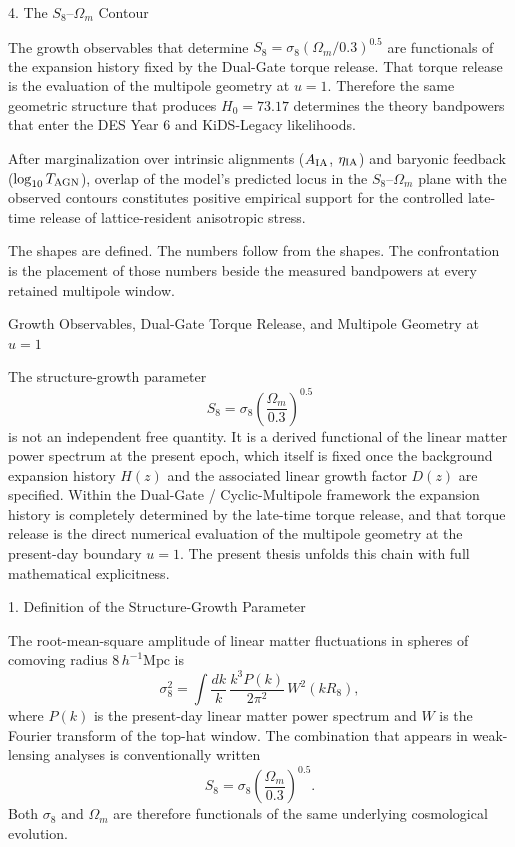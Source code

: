 4. The \(S_8\)–\(\Omega_m\) Contour

The growth observables that determine \(S_8=\sigma_8(\Omega_m/0.3)^{0.5}\) are functionals of the expansion history fixed by the Dual-Gate torque release. That torque release is the evaluation of the multipole geometry at \(u=1\). Therefore the same geometric structure that produces \(H_0=73.17\) determines the theory bandpowers that enter the DES Year 6 and KiDS-Legacy likelihoods.

After marginalization over intrinsic alignments (\(A_{\rm IA}\), \(\eta_{\rm IA}\)) and baryonic feedback (\(\log_{10}T_{\rm AGN}\)), overlap of the model’s predicted locus in the \(S_8\)–\(\Omega_m\) plane with the observed contours constitutes positive empirical support for the controlled late-time release of lattice-resident anisotropic stress.

The shapes are defined.  
The numbers follow from the shapes.  
The confrontation is the placement of those numbers beside the measured bandpowers at every retained multipole window.

Growth Observables, Dual-Gate Torque Release, and Multipole Geometry at \(u=1\)

The structure-growth parameter  
\[
S_8=\sigma_8\left(\frac{\Omega_m}{0.3}\right)^{0.5}
\]  
is not an independent free quantity. It is a derived functional of the linear matter power spectrum at the present epoch, which itself is fixed once the background expansion history \(H(z)\) and the associated linear growth factor \(D(z)\) are specified. Within the Dual-Gate / Cyclic-Multipole framework the expansion history is completely determined by the late-time torque release, and that torque release is the direct numerical evaluation of the multipole geometry at the present-day boundary \(u=1\). The present thesis unfolds this chain with full mathematical explicitness.

1. Definition of the Structure-Growth Parameter

The root-mean-square amplitude of linear matter fluctuations in spheres of comoving radius \(8\,h^{-1}\mathrm{Mpc}\) is
\[
\sigma_8^2=\int\frac{dk}{k}\,\frac{k^3P(k)}{2\pi^2}\,W^2(kR_8),
\]  
where \(P(k)\) is the present-day linear matter power spectrum and \(W\) is the Fourier transform of the top-hat window. The combination that appears in weak-lensing analyses is conventionally written
\[
S_8=\sigma_8\left(\frac{\Omega_m}{0.3}\right)^{0.5}.
\]  
Both \(\sigma_8\) and \(\Omega_m\) are therefore functionals of the same underlying cosmological evolution.

